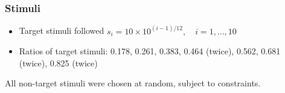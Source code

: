 \documentclass[phd]{nuthesis}
\begin{document}
\subsubsection{Stimuli}\label{stimuli}

\begin{itemize}
\tightlist
\item
  Target stimuli followed
  \(s_i=10 \times 10^{(i-1)/12},\quad i=1,\dots, 10\)
\item
  Ratios of target stimuli: 0.178, 0.261, 0.383, 0.464 (twice), 0.562,
  0.681 (twice), 0.825 (twice)
\end{itemize}

All non-target stimuli were chosen at random, subject to constraints.

\begin{Shaded}
\begin{Highlighting}[]
\OtherTok{\textless{}{-}} \SpecialCharTok{*}\SpecialCharTok{\^{}}\NormalTok{((}\SpecialCharTok{:}\NormalTok{)}\SpecialCharTok{/}\NormalTok{)}
\NormalTok{(} \NormalTok{(} \SpecialCharTok{:}\NormalTok{, }\SpecialCharTok{+} 
  \NormalTok{(} \NormalTok{, } \NormalTok{, } \NormalTok{, } \NormalTok{) }\SpecialCharTok{+} 
  \NormalTok{(} \SpecialCharTok{:}\NormalTok{) }\SpecialCharTok{+} 
  \NormalTok{(} \NormalTok{(} \NormalTok{(}\NormalTok{(}\NormalTok{), } \NormalTok{(}\NormalTok{, }\NormalTok{),}
                      \NormalTok{(}\NormalTok{,}\NormalTok{)) }\SpecialCharTok{+}
  \NormalTok{(} \StringTok{\textquotesingle{}\textquotesingle{}}\NormalTok{, } \NormalTok{) }\SpecialCharTok{+} 

\end{Highlighting}
\end{Shaded}
\end{document}
